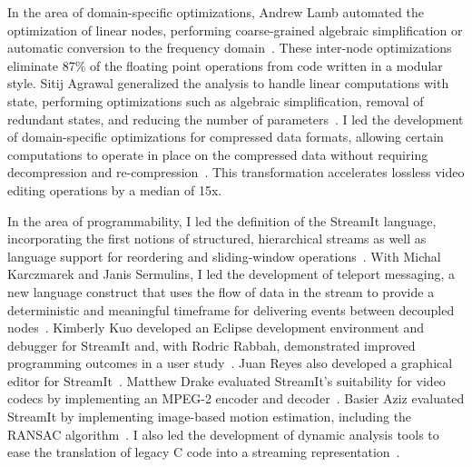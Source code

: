 
In the area of domain-specific optimizations, Andrew Lamb automated
the optimization of linear nodes, performing coarse-grained algebraic
simplification or automatic conversion to the frequency
domain~\cite{lamb-pldi03,lamb-thesis}.  These inter-node
optimizations eliminate 87\% of the floating point operations from
code written in a modular style.  Sitij Agrawal generalized the
analysis to handle linear computations with state, performing
optimizations such as algebraic simplification, removal of redundant
states, and reducing the number of
parameters~\cite{agrawal-cases05,agrawal-thesis}.  I led the
development of domain-specific optimizations for compressed data
formats, allowing certain computations to operate in place on the
compressed data without requiring decompression and
re-compression~\cite{techreport}.  This transformation
accelerates lossless video editing operations by a median of 15x.

In the area of programmability, I led the definition of the StreamIt
language, incorporating the first notions of structured, hierarchical
streams as well as language support for reordering and sliding-window
operations~\cite{thies-cc02,thies-can02,amarasinghe-ijpp05}.  With
Michal Karczmarek and Janis Sermulins, I led the development of
teleport messaging, a new language construct that uses the flow of
data in the stream to provide a deterministic and meaningful timeframe
for delivering events between decoupled nodes~\cite{thies-ppopp05}.
Kimberly Kuo developed an Eclipse development environment and debugger
for StreamIt and, with Rodric Rabbah, demonstrated improved
programming outcomes in a user study~\cite{kuo05,kuo-thesis}.  Juan
Reyes also developed a graphical editor for
StreamIt~\cite{reyes-thesis}.  Matthew Drake evaluated StreamIt's
suitability for video codecs by implementing an MPEG-2 encoder and
decoder~\cite{drake-ipdps06,drake-thesis}.  Basier Aziz evaluated
StreamIt by implementing image-based motion estimation, including the
RANSAC algorithm~\cite{aziz-thesis}.  I also led the development of
dynamic analysis tools to ease the translation of legacy C code into a
streaming representation~\cite{thies-micro07}.

